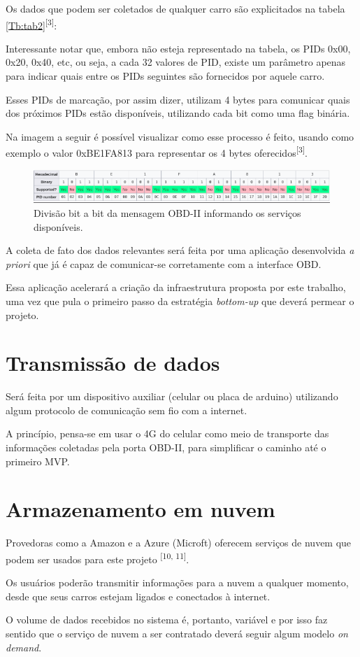 Os dados que podem ser coletados de qualquer carro são explicitados na tabela \ref{Tb:tab2}\textsuperscript{[3]}:



Interessante notar que, embora não esteja representado na tabela, os PIDs 0x00, 0x20, 0x40, etc, ou seja, a cada 32 valores de PID, existe um parâmetro apenas para indicar quais entre os PIDs seguintes são fornecidos por aquele carro.

Esses PIDs de marcação, por assim dizer, utilizam 4 bytes para comunicar quais dos próximos PIDs estão disponíveis, utilizando cada bit como uma flag binária. 

Na imagem a seguir é possível visualizar como esse processo é feito, usando como exemplo o valor 0xBE1FA813 para representar os 4 bytes oferecidos\textsuperscript{[3]}.

\begin{figure}[hp]
    \centering
    
    \includegraphics[scale=0.7]{figures/tabela_dados_disponiveis.png}
    
    \caption{Divisão bit a bit da mensagem OBD-II informando os serviços disponíveis.}
\end{figure}

A coleta de fato dos dados relevantes será feita por uma aplicação desenvolvida \textit{a priori} que já é capaz de comunicar-se corretamente com a interface OBD.

Essa aplicação acelerará a criação da infraestrutura proposta por este trabalho, uma vez que pula o primeiro passo da estratégia \textit{bottom-up} que deverá permear o projeto.

\section{Transmissão de dados}
Será feita por um dispositivo auxiliar (celular ou placa de arduino) utilizando algum protocolo de comunicação sem fio com a internet.

A princípio, pensa-se em usar o 4G do celular como meio de transporte das informações coletadas pela porta OBD-II, para simplificar o caminho até o primeiro MVP.

\section{Armazenamento em nuvem}
Provedoras como a Amazon e a Azure (Microft) oferecem serviços de nuvem que podem ser usados para este projeto \textsuperscript{[10, 11]}.

Os usuários poderão transmitir informações para a nuvem a qualquer momento, desde que seus carros estejam ligados e conectados à internet.

O volume de dados recebidos no sistema é, portanto, variável e por isso faz sentido que o serviço de nuvem a ser contratado deverá seguir algum modelo \textit{on demand}.